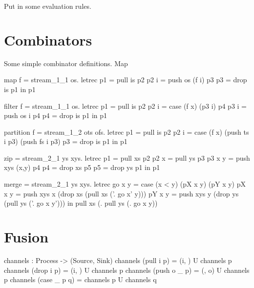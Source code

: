 Put in some evaluation rules.

\section{Combinators}
\label{s:Combinators}

Some simple combinator definitions.
Map 

\begin{code}
map f = stream_1_1 \is os.
  letrec
    p1   = pull is p2
    p2 i = push os (f i) p3
    p3   = drop is p1
  in p1
\end{code}

\begin{code}
filter f = stream_1_1 \is os.
  letrec
    p1   = pull is p2
    p2 i = case (f x) (p3 i) p4
    p3 i = push os i p4
    p4   = drop is p1
  in p1
\end{code}

\begin{code}
partition f = stream_1_2 \is ots ofs.
  letrec
    p1   = pull is p2
    p2 i = case (f x)
            (push ts i p3)
            (push fs i p3)
    p3   = drop is p1
  in p1
\end{code}

\begin{code}
zip = stream_2_1 \xs ys xys.
  letrec
    p1     = pull xs        p2
    p2 x   = pull ys        p3
    p3 x y = push xys (x,y) p4
    p4     = drop xs        p5
    p5     = drop ys        p1
  in p1
\end{code}

\begin{code}
merge = stream_2_1 \xs ys xys.
  letrec
    go x y = case (x < y)
             (pX x y)
             (pY x y)
    pX x y = push xys x
            (drop xs
            (pull xs (\x'. go x' y)))
    pY x y = push xys y
            (drop ys
            (pull ys (\y'. go x y')))
  in pull xs (\x. pull ys (\y. go x y))
\end{code}


\section{Fusion}
\label{s:Fusion}

\begin{code}
channels : Process -> ({Source}, {Sink})
channels (pull i   p) = ({i}, {})  U channels p
channels (drop i   p) = ({i}, {})  U channels p
channels (push o _ p) = ({}, {o})  U channels p
channels (case _ p q) = channels p U channels q
\end{code}



